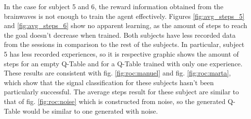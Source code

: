 \documentclass[journal]{IEEEtran}
\begin{document}
In the case for subject 5 and 6, the reward information obtained from the brainwaves is not enough to train the agent effectively. Figures \ref{fig:avg_steps_5} and \ref{fig:avg_steps_6} show no apparent learning, as the amount of steps to reach the goal doesn't decrease when trained. Both subjects have less recorded data from the sessions in comparison to the rest of the subjects. In particular, subject 5 has less recorded experiences, so it is respective graphic shows the amount of steps for an empty Q-Table and for a Q-Table trained with only one experience. These results are consistent with fig. \ref{fig:roc:manuel} and fig. \ref{fig:roc:marta}, which show that the signal classification for these subjects hasn't been particularly successful. The average steps result for these subject are similar to that of fig. \ref{fig:roc:noise} which is constructed from noise, so the generated Q-Table would be similar to one generated with noise.
\end{document}
